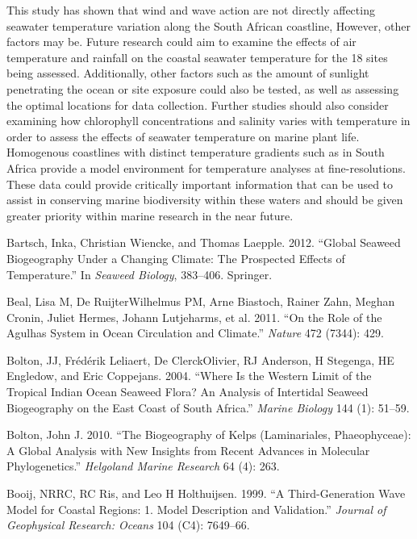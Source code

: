 \documentclass[12pt,a4paper,]{article}
\begin{document}
This study has shown that wind and wave action are not directly
affecting seawater temperature variation along the South African
coastline, However, other factors may be. Future research could aim to
examine the effects of air temperature and rainfall on the coastal
seawater temperature for the 18 sites being assessed. Additionally,
other factors such as the amount of sunlight penetrating the ocean or
site exposure could also be tested, as well as assessing the optimal
locations for data collection. Further studies should also consider
examining how chlorophyll concentrations and salinity varies with
temperature in order to assess the effects of seawater temperature on
marine plant life. Homogenous coastlines with distinct temperature
gradients such as in South Africa provide a model environment for
temperature analyses at fine-resolutions. These data could provide
critically important information that can be used to assist in
conserving marine biodiversity within these waters and should be given
greater priority within marine research in the near future.

\hypertarget{refs}{}
\leavevmode\hypertarget{ref-Bartsch2012}{}%
Bartsch, Inka, Christian Wiencke, and Thomas Laepple. 2012. ``Global
Seaweed Biogeography Under a Changing Climate: The Prospected Effects of
Temperature.'' In \emph{Seaweed Biology}, 383--406. Springer.

\leavevmode\hypertarget{ref-Beal2011}{}%
Beal, Lisa M, De RuijterWilhelmus PM, Arne Biastoch, Rainer Zahn, Meghan
Cronin, Juliet Hermes, Johann Lutjeharms, et al. 2011. ``On the Role of
the Agulhas System in Ocean Circulation and Climate.'' \emph{Nature} 472
(7344): 429.

\leavevmode\hypertarget{ref-Bolton2004}{}%
Bolton, JJ, Frédérik Leliaert, De ClerckOlivier, RJ Anderson, H
Stegenga, HE Engledow, and Eric Coppejans. 2004. ``Where Is the Western
Limit of the Tropical Indian Ocean Seaweed Flora? An Analysis of
Intertidal Seaweed Biogeography on the East Coast of South Africa.''
\emph{Marine Biology} 144 (1): 51--59.

\leavevmode\hypertarget{ref-Bolton2010}{}%
Bolton, John J. 2010. ``The Biogeography of Kelps (Laminariales,
Phaeophyceae): A Global Analysis with New Insights from Recent Advances
in Molecular Phylogenetics.'' \emph{Helgoland Marine Research} 64 (4):
263.

\leavevmode\hypertarget{ref-Booij1999}{}%
Booij, NRRC, RC Ris, and Leo H Holthuijsen. 1999. ``A Third-Generation
Wave Model for Coastal Regions: 1. Model Description and Validation.''
\emph{Journal of Geophysical Research: Oceans} 104 (C4): 7649--66.
\end{document}
